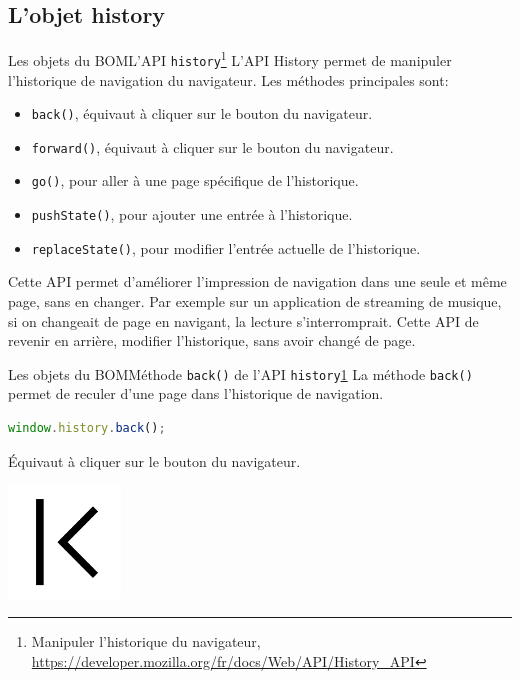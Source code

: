 \documentclass{beamer}
\begin{document}
    \subsection{L'objet history}\label{subsec:history}

    \begin{frame}{Les objets du BOM}{L'API \lstinline{history}\footnote{\label{history}Manipuler l'historique du navigateur, \url{https://developer.mozilla.org/fr/docs/Web/API/History_API}}}
        L'API History permet de manipuler l'historique de navigation du navigateur.
        Les méthodes principales sont:
        \begin{itemize}
            \item \lstinline{back()}, équivaut à cliquer sur le bouton  du navigateur.
            \item \lstinline{forward()}, équivaut à cliquer sur le bouton  du navigateur.
            \item \lstinline{go()}, pour aller à une page spécifique de l'historique.
            \item \lstinline{pushState()}, pour ajouter une entrée à l'historique.
            \item \lstinline{replaceState()}, pour modifier l'entrée actuelle de l'historique.
        \end{itemize}
        \bigbreak
        Cette API permet d'améliorer l'impression de navigation dans une seule et même page, sans en changer.
        Par exemple sur un application de streaming de musique, si on changeait de page en navigant, la lecture s'interromprait.
        Cette API de revenir en arrière, modifier l'historique, sans avoir changé de page.
    \end{frame}

    \begin{frame}[fragile]{Les objets du BOM}{Méthode \lstinline{back()} de l'API \lstinline{history}\cref{history}}
        La méthode \lstinline{back()} permet de reculer d'une page dans l'historique de navigation.
        \begin{lstlisting}[language=JavaScript,title={\tiny{Script JavaScript}}]
window.history.back();
        \end{lstlisting}
        Équivaut à cliquer sur le bouton  du navigateur.
        \begin{center}
            \includegraphics[width=3cm]{image/page-first}
        \end{center}
    \end{frame}
\end{document}
